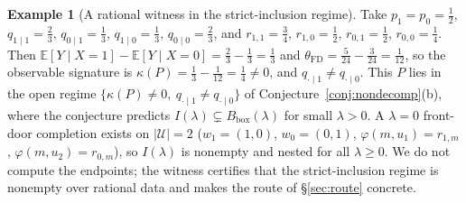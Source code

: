 \documentclass[11pt]{article}
\newcommand{\E}{\mathbb{E}}
\theoremstyle{definition}
\newtheorem{example}{Example}
\theoremstyle{plain}
\theoremstyle{remark}
\begin{document}
\begin{example}[A rational witness in the strict-inclusion regime]\label{ex:kappa}
Take $p_1=p_0=\tfrac12$, $q_{1\mid1}=\tfrac23,\,q_{0\mid1}=\tfrac13$, $q_{1\mid0}=\tfrac13,\,q_{0\mid0}=\tfrac23$,
and $r_{1,1}=\tfrac34,\,r_{1,0}=\tfrac12,\,r_{0,1}=\tfrac12,\,r_{0,0}=\tfrac14$. Then
$\E[Y\mid X{=}1]-\E[Y\mid X{=}0]=\tfrac23-\tfrac13=\tfrac13$ and
$\theta_{\mathrm{FD}}=\tfrac{5}{24}-\tfrac{3}{24}=\tfrac1{12}$, so the observable signature is
$\kappa(P)=\tfrac13-\tfrac1{12}=\tfrac14\neq0$, and
$q_{\cdot\mid1}\neq q_{\cdot\mid0}$. This $P$ lies in the open regime
$\{\kappa(P)\neq0,\ q_{\cdot\mid1}\neq q_{\cdot\mid0}\}$ of
Conjecture~\ref{conj:nondecomp}(b), where the conjecture predicts
$I(\lambda)\subsetneq B_{\mathrm{box}}(\lambda)$ for small $\lambda>0$. A $\lambda=0$ front-door completion
exists on $|\mathcal U|=2$ ($w_1=(1,0)$, $w_0=(0,1)$,
$\varphi(m,u_1)=r_{1,m}$, $\varphi(m,u_2)=r_{0,m}$), so $I(\lambda)$ is nonempty and nested for all
$\lambda\ge0$. We do not compute the endpoints; the witness certifies that the strict-inclusion regime is
nonempty over rational data and makes the route of \S\ref{sec:route} concrete.
\end{example}
\end{document}
